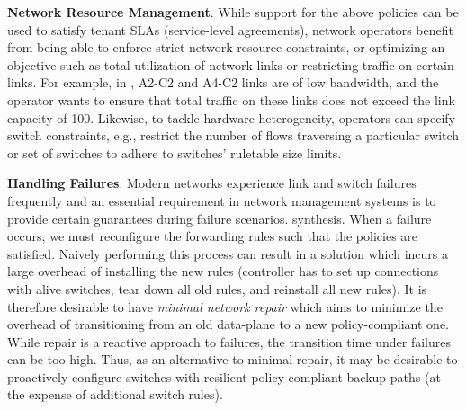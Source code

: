 \begin{compactitemize}
\item \textbf{Network Resource Management}. While support for the
  above policies can be used to satisfy tenant SLAs (service-level
  agreements), network operators benefit from being able to enforce
  strict network resource constraints, or optimizing an objective such
  as total utilization of network links or restricting traffic on
  certain links. For example, in , A2-C2 and A4-C2
  links are of low bandwidth, and the operator wants to ensure that
  total traffic on these links does not exceed the link capacity of 100.
  Likewise, to tackle hardware heterogeneity, operators can specify
  switch constraints, e.g., restrict the number of flows traversing a
  particular switch or set of switches to adhere to switches'
  ruletable size limits.
  
 
 \item \textbf{Handling Failures}. Modern networks experience link and switch failures
 frequently and an essential requirement in network management systems is to
 provide certain guarantees during failure scenarios. 
 synthesis.  When a failure occurs, we must reconfigure the forwarding
 rules such that the policies are satisfied. Naively performing this
 process can result in a solution which incurs a large overhead of
 installing the new rules (controller has to set up connections with
 alive switches, tear down all old rules, and reinstall all new
 rules). It is therefore desirable to have {\em minimal network
   repair} which aims to minimize the overhead of transitioning from
 an old data-plane to a new policy-compliant one. While repair is a
 reactive approach to failures, the transition time under failures can
 be too high. Thus, as an alternative to minimal repair, it may be
 desirable to proactively configure switches with resilient
 policy-compliant backup paths (at the expense of additional switch
 rules).
\end{compactitemize}


